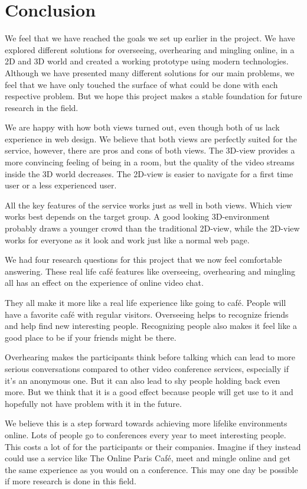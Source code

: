 \documentclass[12pt, titlepage]{article}
\begin{document}
\section{Conclusion}
We feel that we have reached the goals we set up earlier in the project. We have explored different solutions for overseeing, overhearing and mingling online, in a 2D and 3D world and created a working prototype using modern technologies. Although we have presented many different solutions for our main problems, we feel that we have only touched the surface of what could be done with each respective problem. But we hope this project makes a stable foundation for future research in the field.

We are happy with how both views turned out, even though both of us lack experience in web design. We believe that both views are perfectly suited for the service, however, there are pros and cons of both views. The 3D-view provides a more convincing feeling of being in a room, but the quality of the video streams inside the 3D world decreases. The 2D-view is easier to navigate for a first time user or a less experienced user. 

All the key features of the service works just as well in both views. Which view works best depends on the target group. A good looking 3D-environment probably draws a younger crowd than the traditional 2D-view, while the 2D-view works for everyone as it look and work just like a normal web page.

We had four research questions for this project that we now feel comfortable answering. These real life café features like overseeing, overhearing and mingling all has an effect on the experience of online video chat.

They all make it more like a real life experience like going to café. People will have a favorite café with regular visitors. Overseeing helps to recognize friends and help find new interesting people. Recognizing people also makes it feel like a good place to be if your friends might be there.

Overhearing makes the participants think before talking which can lead to more serious conversations compared to other video conference services, especially if it's an anonymous one. But it can also lead to shy people holding back even more. But we think that it is a good effect because people will get use to it and hopefully not have problem with it in the future.

We believe this is a step forward towards achieving more lifelike environments online. Lots of people go to conferences every year to meet interesting people. This costs a lot of for the participants or their companies. Imagine if they instead could use a service like The Online Paris Café, meet and mingle online and get the same experience as you would on a conference. This may one day be possible if more research is done in this field.
\end{document}
